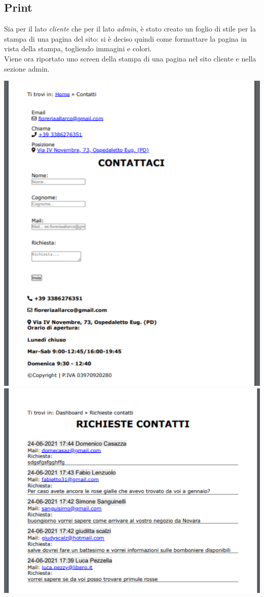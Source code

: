 \subsection{Print}
Sia per il lato \textit{cliente} che per il lato \textit{admin}, è stato creato un foglio di stile per la stampa di una pagina del sito: si è deciso quindi come formattare la pagina in vista della stampa, togliendo immagini e colori. \\Viene ora riportato uno screen della stampa di una pagina nel sito cliente e nella sezione admin.
\begin{center}
\includegraphics[width = 0.35 \textwidth]{../latex/images/clientprint.png}\hspace{5em}\includegraphics[width = 0.45 \textwidth]{../latex/images/adminprint.png}
\end{center}

